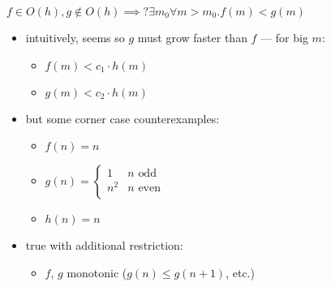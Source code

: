 \begin{frame}{ \fontsize{15}{16}\selectfont$f\in O(h), g\not\in O(h) \implies? \exists m_0\forall m>m_0. f(m) <g(m)$}
    \begin{itemize}
    \item intuitively, seems so $g$ must grow faster than $f$ --- for big $m$:
        \begin{itemize}
        \item $f(m) < c_1\cdot h(m)$
        \item $g(m) < c_2\cdot h(m)$ 
        \end{itemize}
    \item but some corner case counterexamples:
        \begin{itemize}
            \item $f(n) = n$
            \item $g(n) = \begin{cases} 1 & n \text{ odd} \\n^2 & n \text{ even} \\ \end{cases}$
            \item $h(n) = n$
        \end{itemize}
    \item true with additional restriction:
        \begin{itemize}
        \item $f$, $g$ monotonic ($g(n) \le g(n+1)$, etc.)
        \end{itemize}
    \end{itemize}
\end{frame}
